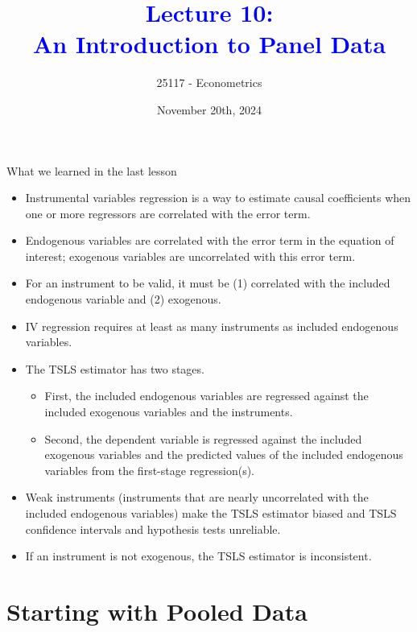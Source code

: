 \documentclass[notes,10pt, aspectratio=169]{beamer}
\title[]{\textcolor{blue}{Lecture 10:\\An Introduction to Panel Data}}
\author{25117 - Econometrics}
\institute[shortinst]{Universitat Pompeu Fabra}
\date{November 20th, 2024}
\begin{document}
\begin{frame}[plain]
\maketitle
\end{frame}



\begin{frame}{What we learned in the last lesson}

\begin{itemize}
    \item Instrumental variables regression is a way to estimate causal coefficients when one or more regressors are correlated with the error term.
    \item  Endogenous variables are correlated with the error term in the equation of interest; exogenous variables are uncorrelated with this error term.
    \item  For an instrument to be valid, it must be (1) correlated with the included endogenous variable and (2) exogenous.
    \item  IV regression requires at least as many instruments as included endogenous variables.
    \item The TSLS estimator has two stages.
\begin{itemize}
    \item First, the included endogenous variables are regressed against the included exogenous variables and the instruments.
    \item Second, the dependent variable is regressed against the included exogenous variables and the predicted values of the included endogenous variables from the first-stage regression(s).
\end{itemize}
    \item Weak instruments (instruments that are nearly uncorrelated with the included endogenous variables) make the TSLS estimator biased and TSLS confidence intervals and hypothesis tests unreliable.
    \item If an instrument is not exogenous, the TSLS estimator is inconsistent.
\end{itemize}

\end{frame}


\section{Starting with Pooled Data}
\end{document}
